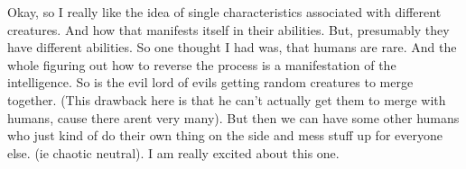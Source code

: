\R Okay, so I really like the idea of single characteristics associated with
different creatures. And how that manifests itself in their abilities. But,
presumably they have different abilities. So one thought I had was, that humans
are rare. And the whole figuring out how to reverse the process is a
manifestation of the intelligence. So is the evil lord of evils getting random
creatures to merge together. (This drawback here is that he can’t actually get
them to merge with humans, cause there arent very many). But then we can have
some other humans who just kind of do their own thing on the side and mess stuff
up for everyone else. (ie chaotic neutral). I am really excited about this one. 

\E
